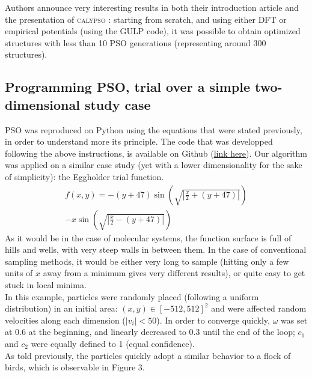 \documentclass[11pt]{article}
\begin{document}
\begin{multicols}{2}
Authors announce very interesting results in both their introduction article and the presentation of \textsc{calypso} \cite{PhysRevB.82.094116,WANG20122063}: starting from scratch, and using either DFT or empirical potentials (using the GULP code), it was possible to obtain optimized structures with less than 10 PSO generations (representing around 300 structures).
\subsection*{Programming PSO, trial over a simple two-dimensional study case}
PSO was reproduced on Python using the equations that were stated previously, in order to understand more its principle. The code that was developped following the above instructions, is available on Github (\href{https://github.com/antoinegslr/ParticleSwarnOptimization}{link here}). Our algorithm was applied on a similar case study (yet with a lower dimensionality for the sake of simplicity): the Eggholder trial function.
\begin{multline*}
    f(x,y)=-(y+47)\sin\left(\sqrt{\left|\frac{x}{2}+(y+47)\right|}\right)\\-x\sin\left(\sqrt{\left|\frac{x}{2}-(y+47)\right|}\right)
\end{multline*}
As it would be in the case of molecular systems, the function surface is full of hills and wells, with very steep walls in between them. In the case of conventional sampling methods, it would be either very long to sample (hitting only a few units of $x$ away from a minimum gives very different results), or quite easy to get stuck in local minima.\\
In this example, particles were randomly placed (following a uniform distribution) in an initial area: $(x,y)\in\left[-512,512\right]^2$ and were affected random velocities along each dimension ($|v_i|<50$). In order to converge quickly, $\omega$ was set at 0.6 at the beginning, and linearly decreased to 0.3 until the end of the loop; $c_1$ and $c_2$ were equally defined to 1 (equal confidence).\\
As told previously, the particles quickly adopt a similar behavior to a flock of birds, which is observable in Figure 3.
\bigskip


\end{multicols}
\end{document}
